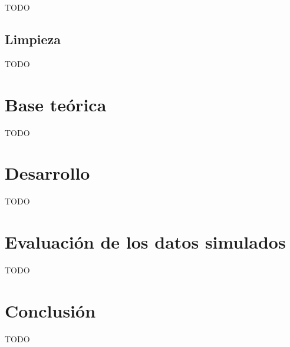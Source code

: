 \documentclass[11pt,spanish,listoffigures,listoftables]{tfgetsinf}
\begin{document}
TODO

\section{Limpieza}

TODO

\chapter{Base teórica}

TODO

\chapter{Desarrollo}

TODO

\chapter{Evaluación de los datos simulados}

TODO



\chapter{Conclusi\'on}

TODO

\end{document}
